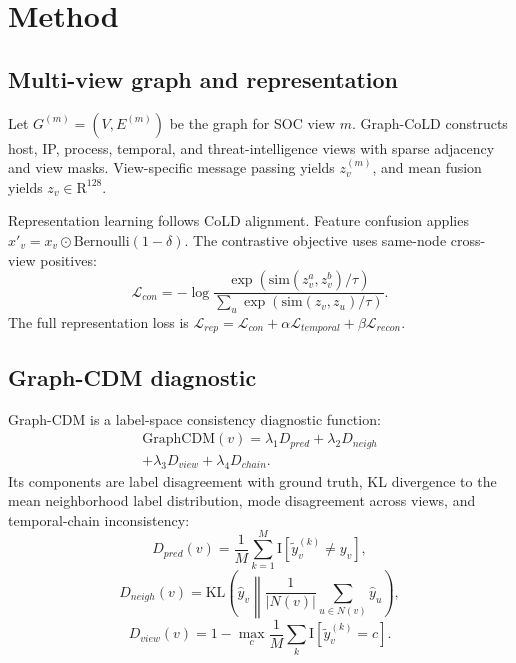 \documentclass[conference]{IEEEtran}
\newcommand{\gcdm}{\mathrm{GraphCDM}}
\newcommand{\ypred}{\hat{y}}
\newcommand{\ynoise}{\tilde{y}}
\begin{document}
\section{Method}
\subsection{Multi-view graph and representation}
Let $G^{(m)}=(V,E^{(m)})$ be the graph for SOC view $m$. Graph-CoLD constructs host, IP, process, temporal, and threat-intelligence views with sparse adjacency and view masks. View-specific message passing yields $z_v^{(m)}$, and mean fusion yields $z_v\in\mathrm{R}^{128}$.

Representation learning follows CoLD alignment. Feature confusion applies $x'_v=x_v\odot \mathrm{Bernoulli}(1-\delta)$. The contrastive objective uses same-node cross-view positives:
\begin{equation}
\mathcal{L}_{con}=-\log\frac{\exp(\mathrm{sim}(z_v^a,z_v^b)/\tau)}{\sum_u\exp(\mathrm{sim}(z_v,z_u)/\tau)}.
\end{equation}
The full representation loss is $\mathcal{L}_{rep}=\mathcal{L}_{con}+\alpha\mathcal{L}_{temporal}+\beta\mathcal{L}_{recon}$.

\subsection{Graph-CDM diagnostic}
Graph-CDM is a label-space consistency diagnostic function:
\begin{multline}
\gcdm(v)=\lambda_1D_{pred}+\lambda_2D_{neigh}\\
+\lambda_3D_{view}+\lambda_4D_{chain}.
\end{multline}
Its components are label disagreement with ground truth, KL divergence to the mean neighborhood label distribution, mode disagreement across views, and temporal-chain inconsistency:
\begin{equation}
D_{pred}(v)=\frac{1}{M}\sum_{k=1}^{M}\mathrm{I}[\ynoise_v^{(k)}\neq y_v],
\end{equation}
\begin{equation}
D_{neigh}(v)=\mathrm{KL}\left(\ypred_v\middle\|\frac{1}{|N(v)|}\sum_{u\in N(v)}\ypred_u\right),
\end{equation}
\begin{equation}
D_{view}(v)=1-\max_c\frac{1}{M}\sum_k\mathrm{I}[\ynoise_v^{(k)}=c].
\end{equation}
\end{document}
